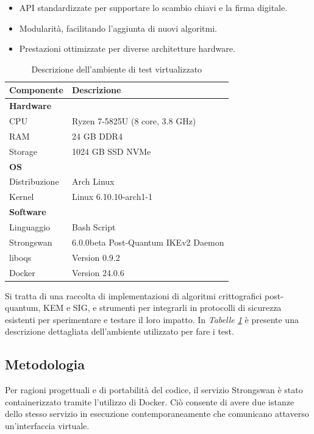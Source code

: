 \begin{itemize}
    \item API standardizzate per supportare lo scambio chiavi e la firma digitale. 
    \item Modularità, facilitando l'aggiunta di nuovi algoritmi. 
    \item Prestazioni ottimizzate per diverse architetture hardware.
\end{itemize}


\begin{table}[htbp] 
    \centering 
    \begin{tabular}{p{4cm} p{8cm}} 
        \toprule
        \textbf{Componente} & \textbf{Descrizione} \\ 
        \midrule
        \textbf{Hardware} & \\ 
        CPU & Ryzen 7-5825U (8 core, 3.8 GHz) \\ 
        RAM & 24 GB DDR4 \\ 
        Storage & 1024 GB SSD NVMe \\ 
        \textbf{OS} & \\ 
        Distribuzione & Arch Linux \\
        Kernel & Linux 6.10.10-arch1-1 \\ 
        \textbf{Software} & \\ 
        Linguaggio & Bash Script \\
        Strongswan & 6.0.0beta Post-Quantum IKEv2 Daemon \\
        liboqs & Version 0.9.2 \\
        Docker & Version 24.0.6 \\ 
        \hline 
    \end{tabular} 
    \caption{Descrizione dell'ambiente di test virtualizzato} 
    \label{tab:env}
\end{table}



\noindent
Si tratta di una raccolta di implementazioni di algoritmi crittografici post-quantum, KEM e SIG, e strumenti per integrarli in protocolli di sicurezza esistenti per sperimentare e testare il loro impatto.
In \textit{Tabelle \ref{tab:env}} è presente una descrizione dettagliata dell'ambiente utilizzato per fare i test.


\subsection{Metodologia}

Per ragioni progettuali e di portabilità del codice, il servizio Strongswan è stato 
containerizzato tramite l'utilizzo di Docker. Ciò consente di avere due istanze dello stesso
servizio in esecuzione contemporaneamente che comunicano attaverso un'interfaccia virtuale. 

